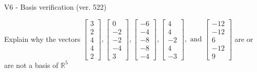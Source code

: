 \begin{exercise}
  \begin{exerciseTitle}V6 - Basis verification (ver. 522)\end{exerciseTitle}
  \begin{exerciseStatement}
    Explain why the vectors \(\left[\begin{array}{r}
3 \\
2 \\
4 \\
4 \\
2
\end{array}\right] , \left[\begin{array}{r}
0 \\
-2 \\
-2 \\
-4 \\
3
\end{array}\right] , \left[\begin{array}{r}
-6 \\
-4 \\
-8 \\
-8 \\
-4
\end{array}\right] , \left[\begin{array}{r}
4 \\
4 \\
-2 \\
4 \\
-3
\end{array}\right] , \text{ and } \left[\begin{array}{r}
-12 \\
-12 \\
6 \\
-12 \\
9
\end{array}\right]\) are or are not a basis of \(\mathbb{R}^5\)	



\end{exerciseStatement}
\end{exercise}
